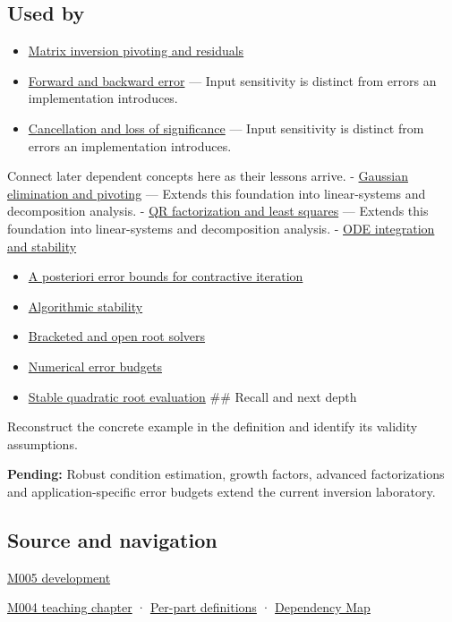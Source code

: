 \subsection{Used by}\label{appendix-8f6a01f284a7-used-by}

\begin{itemize}
\item
  \hyperref[appendix-48d2e66378ab]{Matrix inversion pivoting and residuals}
\item
  \hyperref[appendix-a7fbaf6d1b1c]{Forward and backward error} --- Input sensitivity is distinct from errors an implementation introduces.
\item
  \hyperref[appendix-a2773a6a2f9d]{Cancellation and loss of significance} --- Input sensitivity is distinct from errors an implementation introduces.
\end{itemize}

Connect later dependent concepts here as their lessons arrive. - \hyperref[appendix-f6e77f4a200f]{Gaussian elimination and pivoting} --- Extends this foundation into linear-systems and decomposition analysis. - \hyperref[appendix-c3421e6b4f2c]{QR factorization and least squares} --- Extends this foundation into linear-systems and decomposition analysis. - \hyperref[appendix-18eacf61a04b]{ODE integration and stability}

\begin{itemize}
\tightlist
\item
  \hyperref[appendix-d83b0ad1be7f]{A posteriori error bounds for contractive iteration}
\item
  \hyperref[appendix-aa2bf0d79639]{Algorithmic stability}
\item
  \hyperref[appendix-f63eb850796d]{Bracketed and open root solvers}
\item
  \hyperref[appendix-31b8c295e05f]{Numerical error budgets}
\item
  \hyperref[appendix-b9afba7f63e5]{Stable quadratic root evaluation} \#\# Recall and next depth
\end{itemize}

Reconstruct the concrete example in the definition and identify its validity assumptions.

\textbf{Pending:} Robust condition estimation, growth factors, advanced factorizations and application-specific error budgets extend the current inversion laboratory.

\subsection{Source and navigation}\label{appendix-8f6a01f284a7-source-and-navigation}

\hyperref[01-foundations-i-ch001-when-arithmetic-meets-uncertainty]{M005 development}

\hyperref[01-foundations-i-ch001-a-stretching-ruler-for-real-valued-quantities]{M004 teaching chapter} · \hyperref[appendix-fd090d982a15-m004---parts-61-76]{Per-part definitions} · \hyperref[appendix-4ad47bdd269a]{Dependency Map}
